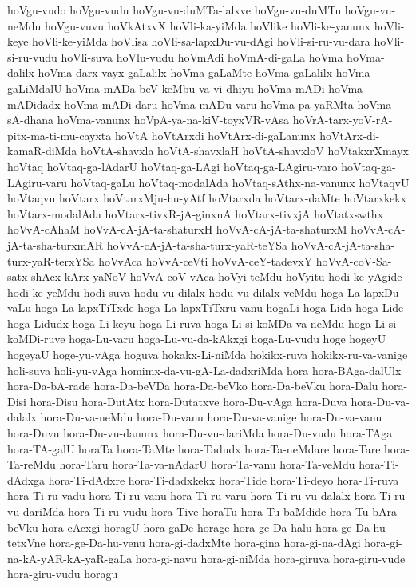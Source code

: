 {hoVgu-vudo
hoVgu-vudu
hoVgu-vu-duMTa-lalxve
hoVgu-vu-duMTu
hoVgu-vu-neMdu
hoVgu-vuvu
hoVkAtxvX
hoVli-ka-yiMda
hoVlike
hoVli-ke-yanunx
hoVli-keye
hoVli-ke-yiMda
hoVlisa
hoVli-sa-lapxDu-vu-dAgi
hoVli-si-ru-vu-dara
hoVli-si-ru-vudu
hoVli-suva
hoVlu-vudu
hoVmAdi
hoVmA-di-gaLa
hoVma
hoVma-dalilx
hoVma-darx-vayx-gaLalilx
hoVma-gaLaMte
hoVma-gaLalilx
hoVma-gaLiMdalU
hoVma-mADa-beV-keMbu-va-vi-dhiyu
hoVma-mADi
hoVma-mADidadx
hoVma-mADi-daru
hoVma-mADu-varu
hoVma-pa-yaRMta
hoVma-sA-dhana
hoVma-vanunx
hoVpA-ya-na-kiV-toyxVR-vAsa
hoVrA-tarx-yoV-rA-pitx-ma-ti-mu-cayxta
hoVtA
hoVtArxdi
hoVtArx-di-gaLanunx
hoVtArx-di-kamaR-diMda
hoVtA-shavxla
hoVtA-shavxlaH
hoVtA-shavxloV
hoVtakxrXmayx
hoVtaq
hoVtaq-ga-lAdarU
hoVtaq-ga-LAgi
hoVtaq-ga-LAgiru-varo
hoVtaq-ga-LAgiru-varu
hoVtaq-gaLu
hoVtaq-modalAda
hoVtaq-sAthx-na-vanunx
hoVtaqvU
hoVtaqvu
hoVtarx
hoVtarxMju-hu-yAtf
hoVtarxda
hoVtarx-daMte
hoVtarxkekx
hoVtarx-modalAda
hoVtarx-tivxR-jA-ginxnA
hoVtarx-tivxjA
hoVtatxswthx
hoVvA-cAhaM
hoVvA-cA-jA-ta-shaturxH
hoVvA-cA-jA-ta-shaturxM
hoVvA-cA-jA-ta-sha-turxmAR
hoVvA-cA-jA-ta-sha-turx-yaR-teYSa
hoVvA-cA-jA-ta-sha-turx-yaR-terxYSa
hoVvAca
hoVvA-ceVti
hoVvA-ceY-tadevxY
hoVvA-coV-Sa-satx-shAcx-kArx-yaNoV
hoVvA-coV-vAca
hoVyi-teMdu
hoVyitu
hodi-ke-yAgide
hodi-ke-yeMdu
hodi-suva
hodu-vu-dilalx
hodu-vu-dilalx-veMdu
hoga-La-lapxDu-vaLu
hoga-La-lapxTiTxde
hoga-La-lapxTiTxru-vanu
hogaLi
hoga-Lida
hoga-Lide
hoga-Lidudx
hoga-Li-keyu
hoga-Li-ruva
hoga-Li-si-koMDa-va-neMdu
hoga-Li-si-koMDi-ruve
hoga-Lu-varu
hoga-Lu-vu-da-kAkxgi
hoga-Lu-vudu
hoge
hogeyU
hogeyaU
hoge-yu-vAga
hoguva
hokakx-Li-niMda
hokikx-ruva
hokikx-ru-va-vanige
holi-suva
holi-yu-vAga
homimx-da-vu-gA-La-dadxriMda
hora
hora-BAga-dalUlx
hora-Da-bA-rade
hora-Da-beVDa
hora-Da-beVko
hora-Da-beVku
hora-Dalu
hora-Disi
hora-Disu
hora-DutAtx
hora-Dutatxve
hora-Du-vAga
hora-Duva
hora-Du-va-dalalx
hora-Du-va-neMdu
hora-Du-vanu
hora-Du-va-vanige
hora-Du-va-vanu
hora-Duvu
hora-Du-vu-danunx
hora-Du-vu-dariMda
hora-Du-vudu
hora-TAga
hora-TA-galU
horaTa
hora-TaMte
hora-Tadudx
hora-Ta-neMdare
hora-Tare
hora-Ta-reMdu
hora-Taru
hora-Ta-va-nAdarU
hora-Ta-vanu
hora-Ta-veMdu
hora-Ti-dAdxga
hora-Ti-dAdxre
hora-Ti-dadxkekx
hora-Tide
hora-Ti-deyo
hora-Ti-ruva
hora-Ti-ru-vadu
hora-Ti-ru-vanu
hora-Ti-ru-varu
hora-Ti-ru-vu-dalalx
hora-Ti-ru-vu-dariMda
hora-Ti-ru-vudu
hora-Tive
horaTu
hora-Tu-baMdide
hora-Tu-bAra-beVku
hora-cAcxgi
horagU
hora-gaDe
horage
hora-ge-Da-halu
hora-ge-Da-hu-tetxVne
hora-ge-Da-hu-venu
hora-gi-dadxMte
hora-gina
hora-gi-na-dAgi
hora-gi-na-kA-yAR-kA-yaR-gaLa
hora-gi-navu
hora-gi-niMda
hora-giruva
hora-giru-vude
hora-giru-vudu
horagu
}
